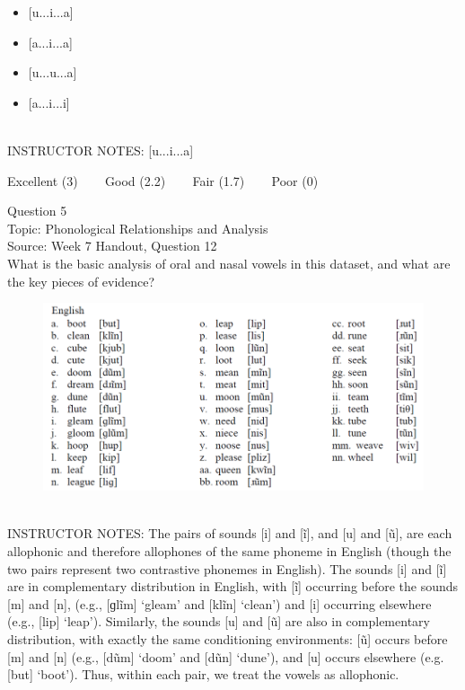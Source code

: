 \documentclass[12pt]{article}
\begin{document}
\begin{itemize} \item {[u...i...a]} \item {[a...i...a]} \item {[u...u...a]} \item {[a...i...i]} \end{itemize}


~\\
INSTRUCTOR NOTES: [u...i...a]


\vfill
Excellent (3) ~~~ Good (2.2) ~~~ Fair (1.7) ~~~ Poor (0)
\newpage

{\large Question 5}\\

Topic: Phonological Relationships and Analysis\\
Source: Week 7 Handout, Question 12\\

What is the basic analysis of oral and nasal vowels in this dataset, and what are the key pieces of evidence?\\

\begin{figure}[H]
\includegraphics{../images/english12.png}
\end{figure}

~\\
INSTRUCTOR NOTES: The pairs of sounds [i] and [ĩ], and [u] and [ũ], are each allophonic and therefore allophones of the same phoneme in English (though the two pairs represent two contrastive phonemes in English). The sounds [i] and [ĩ] are in complementary distribution in English, with [ĩ] occurring before the sounds [m] and [n], (e.g., [ɡlĩm] ‘gleam’ and [klĩn] ‘clean’) and [i] occurring elsewhere (e.g., [lip] ‘leap’). Similarly, the sounds [u] and [ũ] are also in complementary distribution, with exactly the same conditioning environments: [ũ] occurs before [m] and [n] (e.g., [dũm] ‘doom’ and [dũn] ‘dune’), and [u] occurs elsewhere (e.g. [but] ‘boot’). Thus, within each pair, we treat the vowels as allophonic. 
\end{document}
